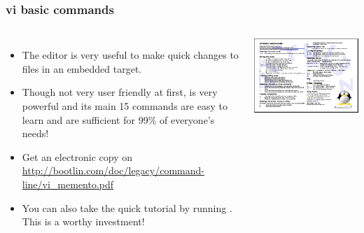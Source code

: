 \begin{frame}
  \frametitle{vi basic commands}
  \begin{columns}
    \begin{itemize}
      \item The  editor is very useful to make quick
      changes to files in an embedded target.
      \item Though not very user friendly at first, 
      is very powerful and its main 15 commands are easy to
      learn and are sufficient for 99\% of everyone's needs!
      \item Get an electronic copy on
      \url{http://bootlin.com/doc/legacy/command-line/vi_memento.pdf}
      \item You can also take the quick tutorial by running
      . This is a worthy investment!
    \end{itemize}
    \includegraphics[width=\textwidth]{slides/course-information/vi_memento.png}
  \end{columns}
\end{frame}

